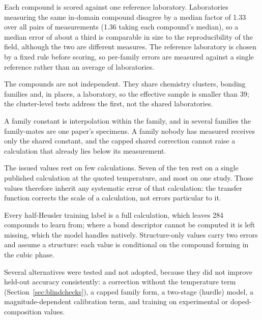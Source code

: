 \documentclass[preprint, 12pt]{elsarticle}
\begin{document}
Each compound is scored against one reference laboratory. Laboratories measuring the same in-domain
compound disagree by a median factor of \num{1.33} over all pairs of measurements (\num{1.36} taking
each compound's median), so a median error of about a third is comparable in size to the
reproducibility of the field, although the two are different measures. The reference laboratory is
chosen by a fixed rule before scoring, so per-family errors are measured against a single reference
rather than an average of laboratories.

The compounds are not independent. They share chemistry clusters, bonding families and, in places, a
laboratory, so the effective sample is smaller than \num{39}; the cluster-level tests address the
first, not the shared laboratories.

A family constant is interpolation within the family, and in several families the family-mates are
one paper's specimens. A family nobody has measured receives only the shared constant, and the
capped shared correction cannot raise a calculation that already lies below its measurement.

The issued values rest on few calculations. Seven of the ten rest on a single published calculation
at the quoted temperature, and most on one study. Those values therefore inherit any systematic error
of that calculation: the transfer function corrects the scale of a calculation, not errors particular
to it.

Every half-Heusler training label is a full calculation, which leaves \num{284} compounds to learn
from; where a bond descriptor cannot be computed it is left missing, which the model handles natively.
Structure-only values carry two errors and assume a structure: each value is conditional on the
compound forming in the cubic phase.

Several alternatives were tested and not adopted, because they did not improve held-out accuracy
consistently: a correction without the temperature term (Section~\ref{sec:blindchecks}), a capped family
form, a two-stage (hurdle) model, a magnitude-dependent calibration term, and training on
experimental or doped-composition values.

\clearpage



\end{document}
